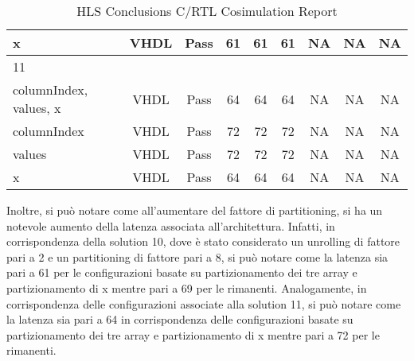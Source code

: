 \begin{table}[H]
\begin{tabular}{|l|c|c|c|c|c|c|c|c|}
		\tabitem x & VHDL & Pass & 61 & 61 & 61 & NA & NA & NA \\
		\hline
		11 &  &  &  &  &  &  &  &  \\
		\tabitem columnIndex, values, x & VHDL & Pass & 64 & 64 & 64 & NA & NA & NA \\
		\tabitem columnIndex & VHDL & Pass & 72 & 72 & 72 & NA & NA & NA \\
		\tabitem values & VHDL & Pass & 72 & 72 & 72 & NA & NA & NA \\
		\tabitem x & VHDL & Pass & 64 & 64 & 64 & NA & NA & NA \\
		\hline
	\end{tabular}
	\caption{HLS Conclusions C/RTL Cosimulation Report}
	\label{tab:hls-conclusions-cosimulation-report}
\end{table}

Inoltre, si può notare come all'aumentare del fattore di partitioning, si ha un notevole aumento della latenza associata all'architettura. Infatti, in corrispondenza della solution 10, dove è stato considerato un unrolling di fattore pari a 2 e un partitioning di fattore pari a 8, si può notare come la latenza sia pari a 61 per le configurazioni basate su partizionamento dei tre array e partizionamento di x mentre pari a 69 per le rimanenti. Analogamente, in corrispondenza delle configurazioni associate alla solution 11, si può notare come la latenza sia pari a 64 in corrispondenza delle configurazioni basate su partizionamento dei tre array e partizionamento di x mentre pari a 72 per le rimanenti.



